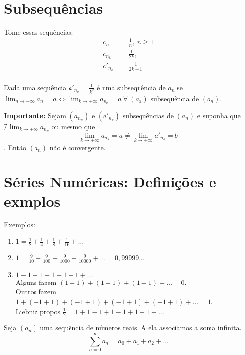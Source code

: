 \documentclass[12pt,openany]{book}
\begin{document}
\section{Subsequências}
\label{sec:s24}
\hspace{5mm} Tome essas sequências:
\begin{align*}
a_n &= \frac{1}{n}, \ n \geq 1 \\
a_{n_k} &= \frac{1}{2k}, \\
a'_{n_k} &= \frac{1}{2k+1} \\
\end{align*}

Dada uma sequência $\displaystyle{a'_{n_k} = \frac{1}{k^2}}$ é uma subsequência de $a_n$ se $\displaystyle{\lim_{n \rightarrow +\infty} a_n = a \Longleftrightarrow \lim_{k \rightarrow +\infty} a_{n_k} = a} \ \forall \ (a_n)$ subsequência de $(a_n)$.

\textbf{Importante: }Sejam $(a_{n_k})$ e $(a'_{n_k})$ subsequências de $(a_n)$ e suponha que $\nexists \lim_{k \rightarrow +\infty} a_{n_k}$ ou mesmo que $$\lim_{k \rightarrow +\infty} a_{n_k} = a \neq \lim_{k \rightarrow +\infty} a'_{n_k} = b $$. Então $(a_n)$ não é convergente.

\section{Séries Numéricas: Definições e exmplos}
\label{sec:s25}
\hspace{5mm} Exemplos:
\begin{enumerate}
\item $\displaystyle{1 = \frac{1}{2} + \frac{1}{4} + \frac{1}{8} + \frac{1}{16} + \hdots}$ \label{ex:251}
\item $\displaystyle{1 = \frac{9}{10} + \frac{9}{100} + \frac{9}{1000} + \frac{9}{10000} + \hdots = 0,99999 \hdots} $ \label{ex:252}
\item $\displaystyle{1 -1 + 1 - 1 + 1 - 1 + \hdots} $ \label{ex:253} \\
Alguns fazem $(1-1) + (1-1) + (1-1) + \hdots = 0$. \\ Outros fazem $1 + (-1 + 1) + (-1 + 1) + (-1 + 1) + (-1 + 1) + \hdots = 1$. \\ Liebniz propos $\frac{1}{2} = 1 + 1 - 1 + 1 - 1 + 1 - 1 + \hdots$ \\
\end{enumerate}

Seja $(a_n)$ uma sequência  de números reais. A ela associamos a \underline{soma infinita}. $$\sum_{n = 0}^{\infty} a_n = a_0 + a_1 + a_2 + \hdots$$
\end{document}
